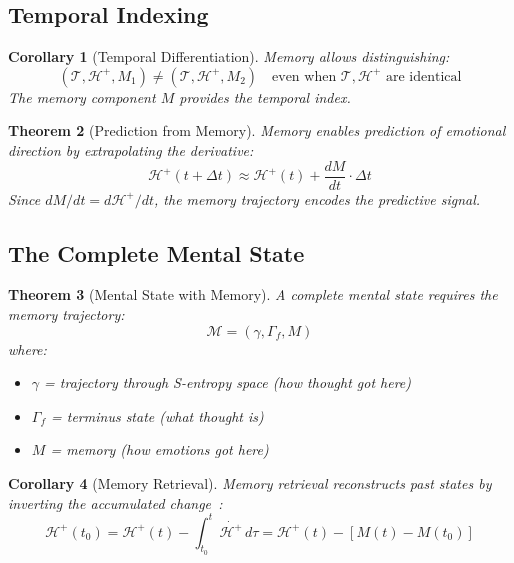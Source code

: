 \documentclass[aps,prd,twocolumn,superscriptaddress,floatfix,nofootinbib]{revtex4-2}
\newtheorem{theorem}{Theorem}[section]
\newtheorem{corollary}[theorem]{Corollary}
\theoremstyle{remark}
\newcommand{\Tcat}{\mathcal{T}}
\newcommand{\Gstate}{\Gamma}
\newcommand{\Hfield}{\mathcal{H}^+}
\newcommand{\Mstate}{\mathcal{M}}
\begin{document}
\subsection{Temporal Indexing}

\begin{corollary}[Temporal Differentiation]
\label{cor:temporal_diff}
Memory allows distinguishing:
\begin{equation}
(\Tcat, \Hfield, M_1) \neq (\Tcat, \Hfield, M_2) \quad \text{even when } \Tcat, \Hfield \text{ are identical}
\end{equation}
The memory component $M$ provides the temporal index.
\end{corollary}

\begin{theorem}[Prediction from Memory]
\label{thm:prediction}
Memory enables prediction of emotional direction by extrapolating the derivative:
\begin{equation}
\Hfield(t + \Delta t) \approx \Hfield(t) + \frac{dM}{dt} \cdot \Delta t
\end{equation}
Since $dM/dt = d\Hfield/dt$, the memory trajectory encodes the predictive signal.
\end{theorem}

\subsection{The Complete Mental State}

\begin{theorem}[Mental State with Memory]
\label{thm:mental_state_memory}
A complete mental state requires the memory trajectory:
\begin{equation}
\Mstate = (\gamma, \Gstate_f, M)
\end{equation}
where:
\begin{itemize}
\item $\gamma$ = trajectory through S-entropy space (how thought got here)
\item $\Gstate_f$ = terminus state (what thought is)
\item $M$ = memory (how emotions got here)
\end{itemize}
\end{theorem}

\begin{corollary}[Memory Retrieval]
\label{cor:retrieval}
Memory retrieval reconstructs past states by inverting the accumulated change~\cite{eichenbaum2000hippocampus}:
\begin{equation}
\Hfield(t_0) = \Hfield(t) - \int_{t_0}^{t} \dot{\Hfield} \, d\tau = \Hfield(t) - [M(t) - M(t_0)]
\end{equation}
\end{corollary}
\end{document}
